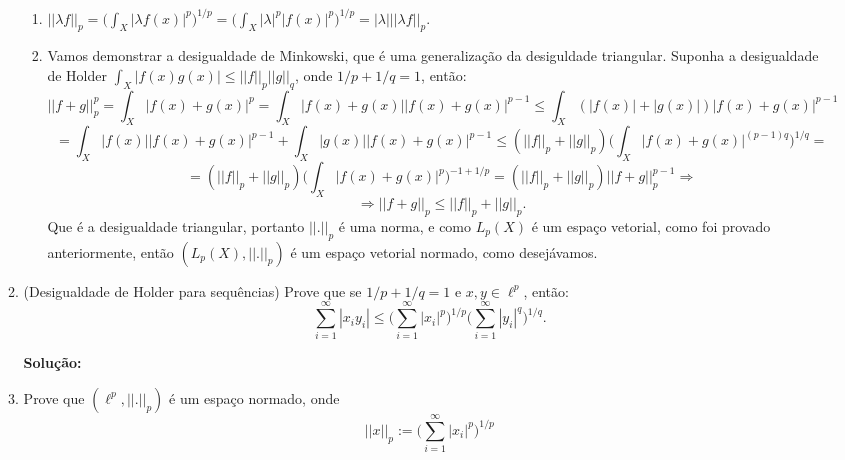 \documentclass{article}
\begin{document}
\begin{enumerate}
\begin{enumerate}
\begin{enumerate}
						\item $||\lambda f||_{p} = \Big ( \int_{X} |\lambda f(x)|^{p} \Big )^{1/p} = \Big ( \int_{X} |\lambda|^{p}| f(x)|^{p} \Big )^{1/p} = |\lambda|||\lambda f||_{p}$.
						
						\item Vamos demonstrar a desigualdade de Minkowski, que é uma generalização da desiguldade triangular. Suponha a desigualdade de Holder $\int_{X} |f(x) g(x)| \leq ||f||_{p} ||g||_{q}$, onde $1/p + 1/q = 1$, então:
						$$
						||f+g||_{p}^{p} =\int_{X} |f(x) + g(x)|^{p} = \int_{X} |f(x) + g(x)||f(x) + g(x)|^{p-1} \leq \int_{X} (|f(x)| + |g(x)|)|f(x) + g(x)|^{p-1}
						$$
						$$
						 = \int_{X} |f(x)||f(x) + g(x)|^{p-1} + \int_{X}|g(x)||f(x) + g(x)|^{p-1} \leq (||f||_{p} + ||g||_{p})\Big( \int_{X} |f(x) + g(x)|^{(p-1)q} \Big)^{1/q} = 
						$$
						$$
						=(||f||_{p} + ||g||_{p})\Big( \int_{X} |f(x) + g(x)|^{p} \Big)^{-1+1/p} = (||f||_{p} + ||g||_{p})||f + g||_{p}^{p-1} \Rightarrow
						$$
						$$
						\Rightarrow ||f+g||_{p} \leq ||f||_{p} + ||g||_{p}. 
						$$
						Que é a desigualdade triangular, portanto $||.||_{p}$ é uma norma, e como $L_{p}(X)$ é um espaço vetorial, como foi provado anteriormente, então $(L_{p}(X), ||.||_{p})$ é um espaço vetorial normado, como desejávamos.
					\end{enumerate}
					
				\item (Desigualdade de Holder para sequências) Prove que se $1/p + 1/q = 1$ e $x, y \in \ell^{p}$, então:
				$$
				\sum \limits_{i=1}^{\infty} |x_{i}y_{i}| \leq \Big(\sum \limits_{i=1}^{\infty} |x_{i}|^{p}\Big)^{1/p} \Big(\sum \limits_{i=1}^{\infty}|y_{i}|^{q}\Big)^{1/q}.
				$$
				
				\textbf{Solução:}
				
				\item Prove que $(\ell^{p}, ||.||_p)$ é um espaço normado, onde
				$$
				||x||_{p} := \Big(\sum \limits_{i=1}^{\infty} |x_{i}|^{p}\Big)^{1/p}
				$$
				

\end{enumerate}
\end{enumerate}
\end{document}

